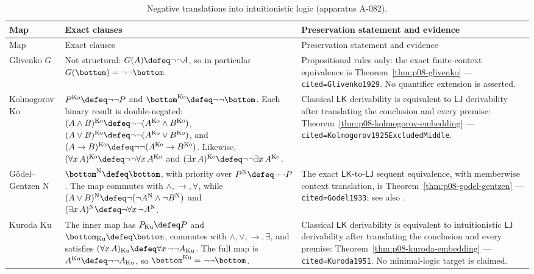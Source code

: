 \begin{landscape}
\begingroup\scriptsize\setlength{\tabcolsep}{3pt}
\begin{longtable}{@{}p{.75in}p{3.60in}p{2.85in}@{}}
\caption{Negative translations into intuitionistic logic (apparatus A-082).}
\label{tab:p08-negative-translations}\\
\toprule
Map & Exact clauses & Preservation statement and evidence \\
\midrule
\endfirsthead
\toprule
Map & Exact clauses & Preservation statement and evidence \\
\midrule
\endhead
Glivenko \(G\) &
Not structural: \(G(A)\defeq\neg\neg A\), so in particular
\(G(\bottom)=\neg\neg\bottom\). &
Propositional rules only: the exact finite-context equivalence is
Theorem~\ref{thm:p08-glivenko} --- \texttt{cited=Glivenko1929}.  No
quantifier extension is asserted. \\
\addlinespace
Kolmogorov \(\mathrm{Ko}\) &
\(P^{\mathrm{Ko}}\defeq\neg\neg P\) and
\(\bottom^{\mathrm{Ko}}\defeq\neg\neg\bottom\).  Each binary result is
double-negated:
\((A\land B)^{\mathrm{Ko}}\defeq
\neg\neg(A^{\mathrm{Ko}}\land B^{\mathrm{Ko}})\),
\((A\lor B)^{\mathrm{Ko}}\defeq
\neg\neg(A^{\mathrm{Ko}}\lor B^{\mathrm{Ko}})\), and
\((A\to B)^{\mathrm{Ko}}\defeq
\neg\neg(A^{\mathrm{Ko}}\to B^{\mathrm{Ko}})\).  Likewise,
\((\forall x\,A)^{\mathrm{Ko}}\defeq
\neg\neg\forall x\,A^{\mathrm{Ko}}\) and
\((\exists x\,A)^{\mathrm{Ko}}\defeq
\neg\neg\exists x\,A^{\mathrm{Ko}}\). &
Classical \(\mathsf{LK}\) derivability is equivalent to
\(\mathsf{LJ}\) derivability after translating the conclusion and every
premise: Theorem~\ref{thm:p08-kolmogorov-embedding} ---
\texttt{cited=Kolmogorov1925ExcludedMiddle}. \\
\addlinespace
G\"odel--Gentzen \(\mathrm N\) &
\(\bottom^{\mathrm N}\defeq\bottom\), with priority over
\(P^{\mathrm N}\defeq\neg\neg P\).  The map commutes with
\(\land,\to,\forall\), while
\((A\lor B)^{\mathrm N}\defeq
\neg(\neg A^{\mathrm N}\land\neg B^{\mathrm N})\) and
\((\exists x\,A)^{\mathrm N}\defeq
\neg\forall x\,\neg A^{\mathrm N}\). &
The exact \(\mathsf{LK}\)-to-\(\mathsf{LJ}\) sequent equivalence, with
memberwise context translation, is Theorem~\ref{thm:p08-godel-gentzen} ---
\texttt{cited=Godel1933}; see also \cite{Gentzen1936}. \\
\addlinespace
Kuroda \(\mathrm{Ku}\) &
The inner map has \(P_{\mathrm{Ku}}\defeq P\) and
\(\bottom_{\mathrm{Ku}}\defeq\bottom\), commutes with
\(\land,\lor,\to,\exists\), and satisfies
\((\forall x\,A)_{\mathrm{Ku}}\defeq
\forall x\,\neg\neg A_{\mathrm{Ku}}\).  The full map is
\(A^{\mathrm{Ku}}\defeq\neg\neg A_{\mathrm{Ku}}\), so
\(\bottom^{\mathrm{Ku}}=\neg\neg\bottom\). &
Classical \(\mathsf{LK}\) derivability is equivalent to intuitionistic
\(\mathsf{LJ}\) derivability after translating the conclusion and every
premise: Theorem~\ref{thm:p08-kuroda-embedding} ---
\texttt{cited=Kuroda1951}.  No minimal-logic target is claimed. \\
\bottomrule
\end{longtable}
\endgroup
\end{landscape}


